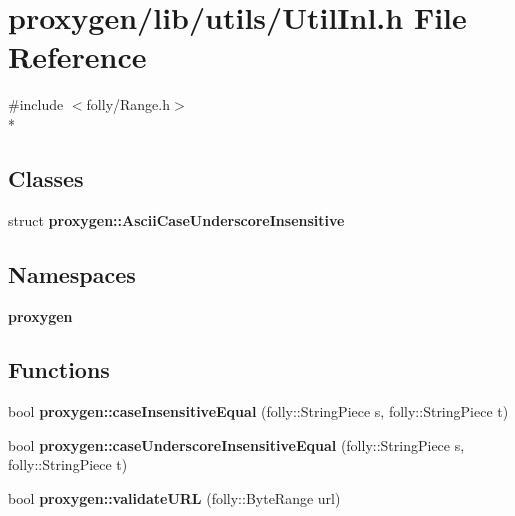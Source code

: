 \section{proxygen/lib/utils/\+Util\+Inl.h File Reference}
\label{UtilInl_8h}
{\ttfamily \#include $<$folly/\+Range.\+h$>$}\\*
\subsection*{Classes}
\begin{DoxyCompactItemize}
\item 
struct {\bf proxygen\+::\+Ascii\+Case\+Underscore\+Insensitive}
\end{DoxyCompactItemize}
\subsection*{Namespaces}
\begin{DoxyCompactItemize}
\item 
 {\bf proxygen}
\end{DoxyCompactItemize}
\subsection*{Functions}
\begin{DoxyCompactItemize}
\item 
bool {\bf proxygen\+::case\+Insensitive\+Equal} (folly\+::\+String\+Piece s, folly\+::\+String\+Piece t)
\item 
bool {\bf proxygen\+::case\+Underscore\+Insensitive\+Equal} (folly\+::\+String\+Piece s, folly\+::\+String\+Piece t)
\item 
bool {\bf proxygen\+::validate\+U\+RL} (folly\+::\+Byte\+Range url)
\end{DoxyCompactItemize}
